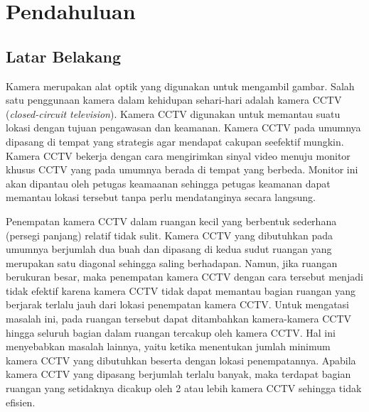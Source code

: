 \chapter{Pendahuluan}
\label{chap:intro}
   
\section{Latar Belakang}
\label{sec:label}

Kamera merupakan alat optik yang digunakan untuk mengambil gambar. Salah satu penggunaan kamera dalam kehidupan sehari-hari adalah kamera CCTV (\textit{closed-circuit television}). Kamera CCTV digunakan untuk memantau suatu lokasi dengan tujuan pengawasan dan keamanan. Kamera CCTV pada umumnya dipasang di tempat yang strategis agar mendapat cakupan seefektif mungkin. Kamera CCTV bekerja dengan cara mengirimkan sinyal video menuju monitor khusus CCTV yang pada umumnya berada di tempat yang berbeda. Monitor ini akan dipantau oleh petugas keamaanan sehingga petugas keamanan dapat memantau lokasi tersebut tanpa perlu mendatanginya secara langsung.

Penempatan kamera CCTV dalam ruangan kecil yang berbentuk sederhana (persegi panjang) relatif tidak sulit. Kamera CCTV yang dibutuhkan pada umumnya berjumlah dua buah dan dipasang di kedua sudut ruangan yang merupakan satu diagonal sehingga saling berhadapan. Namun, jika ruangan berukuran besar, maka penempatan kamera CCTV dengan cara tersebut menjadi tidak efektif karena kamera CCTV tidak dapat memantau bagian ruangan yang berjarak terlalu jauh dari lokasi penempatan kamera CCTV. Untuk mengatasi masalah ini, pada ruangan tersebut dapat ditambahkan kamera-kamera CCTV hingga seluruh bagian dalam ruangan tercakup oleh kamera CCTV. Hal ini menyebabkan masalah lainnya, yaitu ketika menentukan jumlah minimum kamera CCTV yang dibutuhkan beserta dengan lokasi penempatannya. Apabila kamera CCTV yang dipasang berjumlah terlalu banyak, maka terdapat bagian ruangan yang setidaknya dicakup oleh 2 atau lebih kamera CCTV sehingga tidak efisien.


